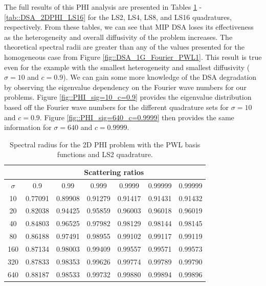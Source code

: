 The full results of this PHI analysis are presented in Tables \ref{tab::DSA_2DPHI_LS2} - \ref{tab::DSA_2DPHI_LS16} for the LS2, LS4, LS8, and LS16 quadratures, respectively. From these tables, we can see that MIP DSA loses its effectiveness as the heterogeneity and overall diffusivity of the problem increases. The theoretical spectral radii are greater than any of the values presented for the homogeneous case from Figure \ref{fig::DSA_1G_Fourier_PWL1}. This result is true even for the example with the smallest heterogeneity and smallest diffusivity ($\sigma=10$ and $c=0.9$). We can gain some more knowledge of the DSA degradation by observing the eigenvalue dependency on the Fourier wave numbers for our problems. Figure \ref{fig::PHI_sig=10_c=0.9} provides the eigenvalue distribution based off the Fourier wave numbers for the different quadrature sets for $\sigma=10$ and $c=0.9$. Figure \ref{fig::PHI_sig=640_c=0.9999} then provides the same information for $\sigma=640$ and $c=0.9999$.

\begin{table}
\caption{Spectral radius for the 2D PHI problem with the PWL basis functions and LS2 quadrature.}
\begin{center}
\def\arraystretch{1.6}
\begin{tabular}{|c|c|c|c|c|c|c|}
\hline
& \multicolumn{6}{c}{Scattering ratios}\vline\\
\hline
$\sigma$ & 0.9 & 0.99& 0.999& 0.9999& 0.99999& 0.99999 \\
\hline
10  &0.77091&0.89908&0.91279&0.91417&0.91431&0.91432 \\
20  &0.82038&0.94425&0.95859&0.96003&0.96018&0.96019  \\
40  &0.84803&0.96525&0.97982&0.98129&0.98144&0.98145  \\
80  &0.86188&0.97491&0.98955&0.99102&0.99117&0.99119  \\
160&0.87134&0.98003&0.99409&0.99557&0.99571&0.99573  \\
320&0.87833&0.98353&0.99626&0.99774&0.99789&0.99790  \\
640&0.88187&0.98533&0.99732&0.99880&0.99894&0.99896  \\
\hline
\end{tabular}
\end{center}
\label{tab::DSA_2DPHI_LS2}
\end{table}

